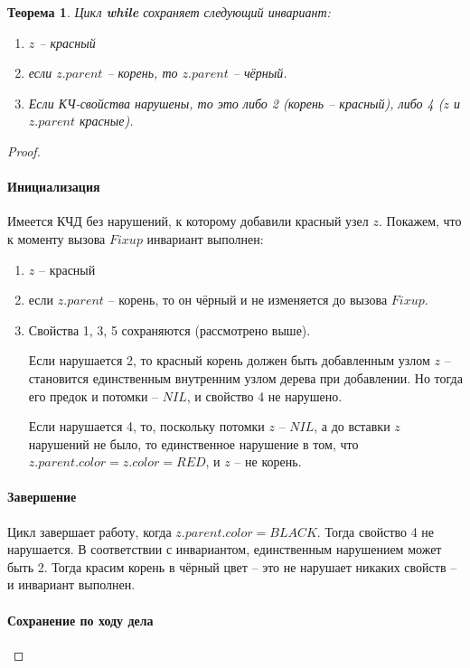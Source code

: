 \documentclass[a4paper,12pt]{article}
\newtheorem*{theorem}{Теорема}
\begin{document}
\begin{theorem}
Цикл \textbf{while} сохраняет следующий инвариант:
\begin{enumerate}
    \item $z$ -- красный
    \item если $z.parent$ -- корень, то $z.parent$ -- чёрный.
    \item Если КЧ-свойства нарушены, то это либо 2 (корень -- красный), либо 4 ($z$ и $z.parent$ красные).
\end{enumerate}
\end{theorem}
\begin{proof}
\ 
    \paragraph{Инициализация}
    
    Имеется КЧД без нарушений, к которому добавили красный узел $z$. Покажем, что к моменту вызова $Fixup$ инвариант выполнен:
    \begin{enumerate}
        \item $z$ -- красный
        \item если $z.parent$ -- корень, то он чёрный и не изменяется до вызова $Fixup$.
        \item Свойства 1, 3, 5 сохраняются (рассмотрено выше).
        
        Если нарушается 2, то красный корень должен быть добавленным узлом $z$ -- становится единственным внутренним узлом дерева при добавлении. Но тогда его предок и потомки -- $NIL$, и свойство 4 не нарушено.
        
        Если нарушается 4, то, поскольку потомки $z$ -- $NIL$, а до вставки $z$ нарушений не было, то единственное нарушение в том, что $z.parent.color = z.color = RED$, и $z$ -- не корень.
    \end{enumerate}
    
    \paragraph{Завершение}
    
    Цикл завершает работу, когда $z.parent.color = BLACK$. Тогда свойство 4 не нарушается. В соответствии с инвариантом, единственным нарушением может быть 2. Тогда красим корень в чёрный цвет -- это не нарушает никаких свойств -- и инвариант выполнен.
    
    \paragraph{Сохранение по ходу дела}
    

\end{proof}
\end{document}
